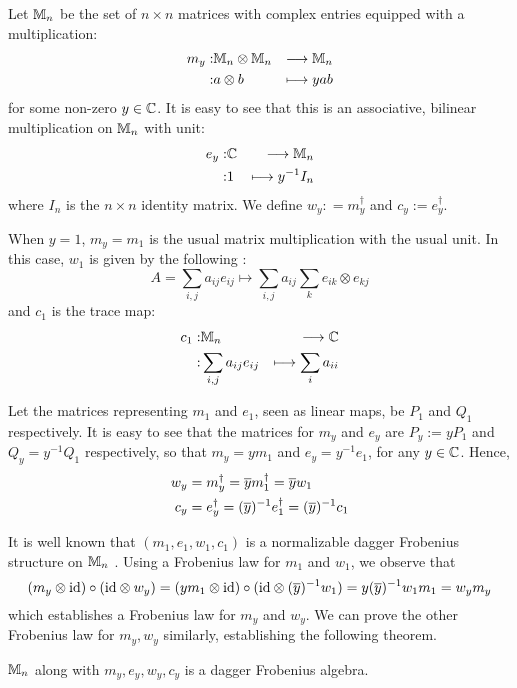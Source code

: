 \documentclass[./Thick_TQFTs_and_Quantum_Information.tex]{subfiles}
\begin{document}
Let $\mathbb{M}_n$ be the set of $n \times n$ matrices with complex entries equipped
with a multiplication:
\begin{eqnarray*}
  m_y :& \mathbb{M}_n \otimes \mathbb{M}_n &\stackrel{}{\longrightarrow}     \mathbb{M}_n \\
      :&  a   \otimes b    &\longmapsto yab
\end{eqnarray*}
for some non-zero $y \in \mathbb{C}$. It is easy to see that this is an associative,
bilinear multiplication on $\mathbb{M}_n$ with unit:
\begin{eqnarray*}
  e_y :& \mathbb{C} &\stackrel{}{\longrightarrow}     \mathbb{M}_n \\
    :&  1 &\longmapsto y^{-1}I_n
\end{eqnarray*}
where $I_n$ is the $n \times n$ identity matrix. We define
$w_y : = m_y^{\dagger}$ and $c _y := e_y^{\dagger}$.

When $y = 1$, $m_y = m_1$ is the usual matrix multiplication with the usual
unit. In this case, $w_1$ is given by the following \cite[8]{CatQChan}:
\[
  A = \sum_{i, j} a_{ij}e_{ij}
    \mapsto \sum_{i, j} a_{ij} \sum_{k} e_{ik} \otimes e_{kj}
\]
and $c_1$ is the trace map:
\begin{eqnarray*}
  c_1 :& \mathbb{M}_n &\stackrel{}{\longrightarrow}     \mathbb{C} \\
      :& \sum_{i, j} a_{ij}e_{ij} &\longmapsto \sum_{i} a_{ii}
\end{eqnarray*}

Let the matrices representing $m_1$ and $e_1$, seen as linear maps, be $P_1$ and
$Q_1$ respectively. It is easy to see that the matrices for $m_y$ and $e_y$ are
$P_y := yP_1$ and $Q_y = y^{-1}Q_1$ respectively, so that $m_y = ym_1$ and
$e_y = y^{-1}e_1$, for any $y \in \mathbb{C}$. Hence,
\begin{align*}
  w_y &= m_y^{\dagger} = \overline{y}m_1^{\dagger} = \overline{y}w_1 \\
  c_y &= e_y^{\dagger} = (\overline{y})^{-1}e_1^{\dagger} = (\overline{y})^{-1}c_1
\end{align*}

It is well known that $(m_1, e_1, w_1, c_1)$ is a normalizable dagger Frobenius
structure on $\mathbb{M}_n$ \cite[8, 10]{CatQChan}. Using a Frobenius law for $m_1$
and $w_1$, we observe that
\[
  (m_y \otimes \text{id}) \circ (\text{id} \otimes w_y)
  = (ym_1 \otimes \text{id}) \circ (\text{id} \otimes (\overline{y})^{-1}w_1)
  = y(\overline{y})^{-1}w_1m_1
  = w_ym_y
\]
which establishes a Frobenius law for $m_y$ and $w_y$. We can prove the other
Frobenius law for $m_y, w_y$ similarly, establishing the following theorem.

\begin{thm}
$\mathbb{M}_n$ along with $m_y, e_y, w_y, c_y$ is a dagger Frobenius algebra.
\end{thm}
\end{document}
